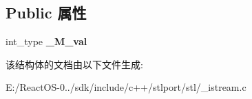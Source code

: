 \subsection*{Public 属性}
\begin{DoxyCompactItemize}
\item 
\mbox{\label{struct___scan__for__int__val_a34cca5b3a749e0cab9853c5894c96cee}} 
int\+\_\+type {\bfseries \+\_\+\+M\+\_\+val}
\end{DoxyCompactItemize}


该结构体的文档由以下文件生成\+:\begin{DoxyCompactItemize}
\item 
E\+:/\+React\+O\+S-\/0../sdk/include/c++/stlport/stl/\+\_\+istream.\+c\end{DoxyCompactItemize}
